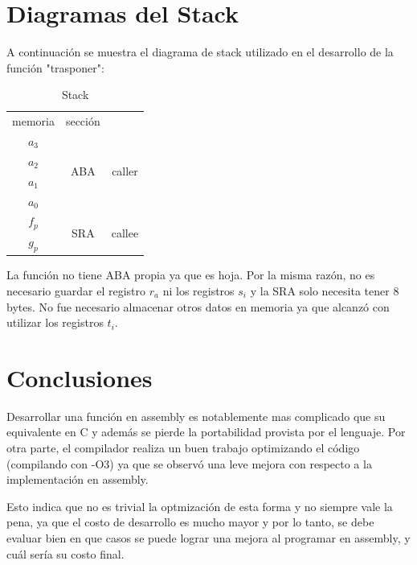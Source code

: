 \documentclass[11pt,a4paper]{article}
\begin{document}
\section{Diagramas del Stack}

A continuaci\'on se muestra el diagrama de stack utilizado en el desarrollo de
la funci\'on "trasponer":

\begin{table}[h!]
  \begin{center}
    \label{tab:table1}
    \begin{tabular}{|c|c|c}
        \cline{1-2}
        memoria & secci\'on & \\
        \cline{1-2}
        \cline{1-2}
        $a_3$ & \multirow{4}{*}{ABA} & \multirow{4}{*}{caller}\\
        \cline{1-1}
        $a_2$ & &\\
        \cline{1-1}
        $a_1$ & &\\
        \cline{1-1}
        $a_0$ & &\\
        \hline
        $f_p$ & \multirow{2}{*}{SRA} & \multirow{2}{*}{callee}\\
        \cline{1-1}
        $g_p$ & &\\
        \cline{1-2}
    \end{tabular}
    \caption{Stack}
  \end{center}
\end{table}

La funci\'on no tiene ABA propia ya que es hoja. Por la misma raz\'on, no
es necesario guardar el registro $r_a$ ni los registros $s_i$ y la SRA solo necesita tener 8 bytes.
No fue necesario almacenar otros datos en memoria ya que alcanzó con utilizar
los registros $t_i$.

\section{Conclusiones}

Desarrollar una funci\'on en assembly es notablemente mas complicado que su equivalente en C y
adem\'as se pierde la portabilidad provista por el lenguaje. Por otra parte, el compilador
realiza un buen trabajo optimizando el c\'odigo (compilando con -O3) ya que se observ\'o una
leve mejora con respecto a la implementaci\'on en assembly.

Esto indica que no es trivial la optmizaci\'on de esta forma y no siempre
vale la pena, ya que el costo de desarrollo es mucho mayor y por lo tanto, se
debe evaluar bien en que casos se puede lograr una mejora al programar en
assembly, y cu\'al ser\'ia su costo final.
\end{document}
